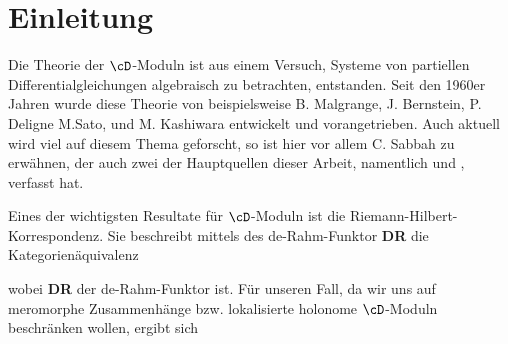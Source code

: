 \chapter{Einleitung}

Die Theorie der $\cD$-Moduln ist aus einem Versuch, Systeme von partiellen
Differentialgleichungen algebraisch zu betrachten, entstanden. Seit den 1960er
Jahren wurde diese Theorie von beispielsweise B. Malgrange, J. Bernstein, P.
Deligne M.Sato, und M. Kashiwara entwickelt und vorangetrieben.
Auch aktuell wird viel auf diesem Thema geforscht, so ist hier vor allem
C. Sabbah zu erwähnen, der auch zwei der Hauptquellen dieser Arbeit, namentlich
\cite{sabbah_cimpa90} und \cite{sabbah_Fourier-local}, verfasst hat.

Eines der wichtigsten Resultate für $\cD$-Moduln ist die
Riemann-Hilbert-Korrespondenz. Sie beschreibt mittels des de-Rahm-Funktor
\textbf{DR} die Kategorienäquivalenz
\begin{center}
\end{center}
\iffalse
  \begin{center}
  \end{center}
  wobei \textbf{DR} der de-Rahm-Funktor ist.
  Für unseren Fall, da wir uns auf meromorphe Zusammenhänge bzw. lokalisierte
  holonome $\cD$-Moduln beschränken wollen, ergibt sich
